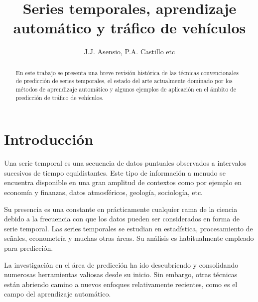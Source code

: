 \documentclass{llncs}
\begin{document}

\title{Series temporales, aprendizaje automático y tráfico de vehículos}


\author{J.J. Asensio, P.A. Castillo etc}


\maketitle
%
%
\begin{abstract} 
En este trabajo se presenta una breve revisión histórica de las técnicas convencionales de predicción de series temporales, el estado del arte actualmente dominado por los métodos de aprendizaje automático y algunos ejemplos de aplicación en el ámbito de predicción de tráfico de vehículos. 
\end{abstract}


%
%
\section{Introducción}
\label{sec:intro}

Una serie temporal es una secuencia de datos puntuales observados a intervalos sucesivos de tiempo equidistantes. Este tipo de información a menudo se encuentra disponible en una gran amplitud de contextos como por ejemplo en economía y finanzas, datos atmosféricos, geología, sociología, etc. 

Su presencia es una constante en prácticamente cualquier rama de la ciencia debido a la frecuencia con que los datos pueden ser considerados en forma de serie temporal. Las series temporales se estudian en estadística, procesamiento de señales, econometría y muchas otras áreas. Su análisis es habitualmente empleado para predicción. 

La investigación en el área de predicción ha ido descubriendo y consolidando numerosas herramientas valiosas desde su inicio. Sin embargo, otras técnicas están abriendo camino a nuevos enfoques relativamente recientes, como es el campo del aprendizaje automático.  
\end{document}
